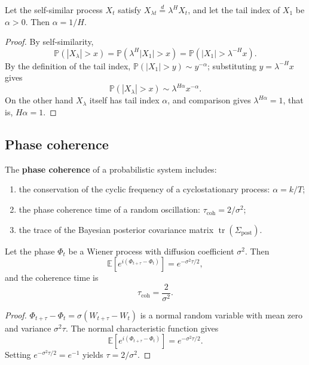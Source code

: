 \begin{proposition}\label{prop:hurst_tail_duality}
Let the self-similar process $X_t$ satisfy $X_{\lambda t}\stackrel{d}{=}\lambda^H X_t$, and let the tail index of $X_1$ be $\alpha>0$. Then $\alpha=1/H$.
\end{proposition}

\begin{proof}
By self-similarity,
\[
\mathbb P(|X_\lambda|>x)=\mathbb P(\lambda^H|X_1|>x)=\mathbb P(|X_1|>\lambda^{-H}x).
\]
By the definition of the tail index, $\mathbb P(|X_1|>y)\sim y^{-\alpha}$; substituting $y=\lambda^{-H}x$ gives
\[
\mathbb P(|X_\lambda|>x)\sim \lambda^{H\alpha}x^{-\alpha}.
\]
On the other hand $X_\lambda$ itself has tail index $\alpha$, and comparison gives $\lambda^{H\alpha}=1$, that is, $H\alpha=1$.
\end{proof}

\subsection{Phase coherence}

\begin{definition}\label{def:probability_angular_momentum}
The \textbf{phase coherence} of a probabilistic system includes:
\begin{enumerate}[label=(\roman*)]
    \item the conservation of the cyclic frequency of a cyclostationary process: $\alpha=k/T$;
    \item the phase coherence time of a random oscillation: $\tau_{\mathrm{coh}}=2/\sigma^2$;
    \item the trace of the Bayesian posterior covariance matrix $\operatorname{tr}(\Sigma_{\mathrm{post}})$.
\end{enumerate}
\end{definition}

\begin{lemma}\label{ch15_coherence_time}
Let the phase $\Phi_t$ be a Wiener process with diffusion coefficient $\sigma^2$. Then
\[
\mathbb E[e^{i(\Phi_{t+\tau}-\Phi_t)}]=e^{-\sigma^2\tau/2},
\]
and the coherence time is
\[
\tau_{\mathrm{coh}}=\frac{2}{\sigma^2}.
\]
\end{lemma}

\begin{proof}
$\Phi_{t+\tau}-\Phi_t=\sigma(W_{t+\tau}-W_t)$ is a normal random variable with mean zero and variance $\sigma^2\tau$. The normal characteristic function gives
\[
\mathbb E[e^{i(\Phi_{t+\tau}-\Phi_t)}]=e^{-\sigma^2\tau/2}.
\]
Setting $e^{-\sigma^2\tau/2}=e^{-1}$ yields $\tau=2/\sigma^2$.
\end{proof}

